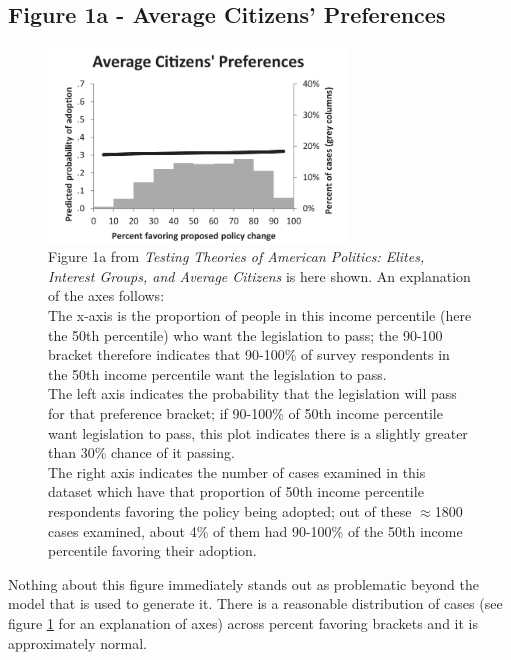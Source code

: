 \documentclass[]{article}
\begin{document}
\subsection{Figure 1a - Average Citizens' Preferences}
\begin{figure}[H]
	\begin{center}
		\includegraphics[width=300px]{./figures/paper/average-citizens-preferences.png}
	\end{center}	
	\caption{Figure 1a from \textit{Testing Theories of American Politics: Elites, Interest Groups, and Average Citizens} is here shown. An explanation of the axes follows: \\The x-axis is the proportion of people in this income percentile (here the 50th percentile) who want the legislation to pass; the 90-100 bracket therefore indicates that 90-100\% of survey respondents in the 50th income percentile want the legislation to pass. \\The left axis indicates the probability that the legislation will pass for that preference bracket; if 90-100\% of 50th income percentile want legislation to pass, this plot indicates there is a slightly greater than 30\% chance of it passing. \\The right axis indicates the number of cases examined in this dataset which have that proportion of 50th income percentile respondents favoring the policy being adopted; out of these $\approx$1800 cases examined, about 4\% of them had 90-100\% of the 50th income percentile favoring their adoption.}
	\label{paper_figure1a}
\end{figure}

Nothing about this figure immediately stands out as problematic beyond the model that is used to generate it. There is a reasonable distribution of cases (see figure \ref{paper_figure1a} for an explanation of axes) across percent favoring brackets and it is approximately normal.
\end{document}
